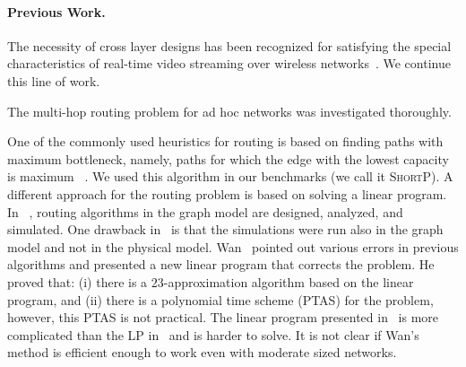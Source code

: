 \documentclass[12pt]{article}
\newenvironment{proof sketch}[1]{\noindent {\emph{Proof sketch of #1:}}}{\hfill \qed}
\newcommand{\SNR}{\text{\sc{snr}}}
\newcommand{\MCS}{\text{\sc{mcs}}}
\newcommand{\algB}{\textsc{ShortP}}
\newcommand{\algS}{\algB}
\begin{document}
\paragraph{Previous Work.}
The necessity of cross layer designs has been recognized for
satisfying the special characteristics of real-time video streaming
over wireless
networks~\cite{shan2005cross,setton2005cross,khan2006application}.  We
continue this line of work.

The multi-hop routing problem for ad hoc networks was investigated
thoroughly.

One of the commonly used heuristics for routing is based on finding
paths with maximum bottleneck, namely, paths for which the edge with
the lowest capacity is maximum ~\cite{draves2004routing}.  We used
this algorithm in our benchmarks (we call it \algS). A different
approach for the routing problem is based on solving a linear program.
In ~\cite{kumar2005algorithmic,jain2005impact,alicherry2005joint11},
routing algorithms in the graph model are designed, analyzed, and
simulated.  One drawback
in~\cite{kumar2005algorithmic,jain2005impact,alicherry2005joint11} is
that the simulations were run also in the graph model and not in the
physical model.  Wan~\cite{wan2009multiflows} pointed out various
errors in previous algorithms and presented a new linear program that
corrects the problem. He proved that: (i) there is a
$23$-approximation algorithm based on the linear program, and (ii)
there is a polynomial time scheme (PTAS) for the problem, however,
this PTAS is not practical.  The linear program presented
in~\cite{wan2009multiflows} is more complicated than the LP
in~\cite{kumar2005algorithmic,alicherry2005joint11,buragohain2007improved}
and is harder to solve. It is not clear if Wan's method is efficient
enough to work even with moderate sized networks.
\end{document}
